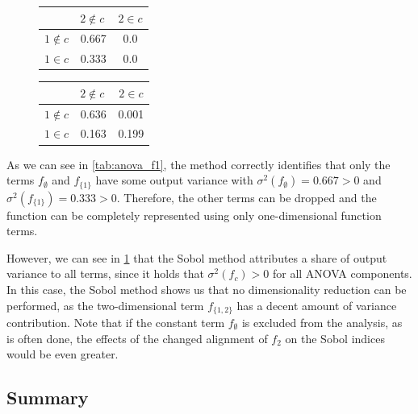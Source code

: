 \documentclass[
  a4paper,  %
  twoside,  %
  bibliography=totoc,
  headsepline,
  cleardoublepage=empty,
  parskip=half,
  draft=false
]{scrbook}
\begin{document}
\begin{mdframed}[style=style]
\begin{figure}[H]
        \centering
\begin{minipage}[H]{.45\textwidth}
  \centering
  \begin{tabular}{ l | c c }
& $2 \notin c~$ & $2 \in c$ \\
\hline
$1 \notin c$ & 0.667 & 0.0\\
$1 \in c$ & 0.333 & 0.0\\
\end{tabular}
\delimit
  \label{tab:anova_f1}
    \end{minipage}%
    \hspace{.05\textwidth}
    \begin{minipage}[H]{0.45\textwidth}
  \centering
  \begin{tabular}{ l | c c }
& $2 \notin c~$ & $2 \in c$ \\
\hline
$1 \notin c$ & 0.636 & 0.001\\
$1 \in c$ & 0.163 & 0.199\\
\end{tabular}
\delimit
  \label{tab:anova_f2}
    \end{minipage}
\end{figure}
\end{mdframed}
%
As we can see in \cref{tab:anova_f1}, the method correctly identifies that only the terms $f_\emptyset$ and $f_{\{1\}}$ have some output variance with $\sigma^2(f_\emptyset)=0.667 > 0$ and $\sigma^2(f_{\{1\}})=0.333 > 0$.
Therefore, the other terms can be dropped and the function can be completely represented using only one-dimensional function terms.

However, we can see in \cref{tab:anova_f2} that the Sobol method attributes a share of output variance to all terms, since  it holds that $\sigma^2(f_{c}) > 0$ for all ANOVA components.
In this case, the Sobol method shows us that no dimensionality reduction can be performed, as the two-dimensional term $f_{\{1,2\}}$ has a decent amount of variance contribution.
Note that if the constant term $f_\emptyset$ is excluded from the analysis, as is often done, the effects of the changed alignment of $f_2$ on the Sobol indices would be even greater.

\subsection{Summary}
\end{document}
